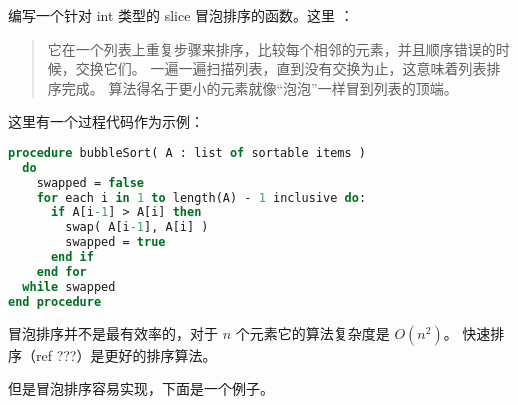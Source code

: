 \begin{Exercise}[title={冒泡排序},difficulty=5]
\label{ex:bubble}
\Question\label{ex:bubble q1} 编写一个针对 int 类型的 slice 冒泡排序的函数。这里 \cite{bubblesort}：
\begin{quote}
它在一个列表上重复步骤来排序，比较每个相邻的元素，并且顺序错误的时候，交换它们。
一遍一遍扫描列表，直到没有交换为止，这意味着列表排序完成。
算法得名于更小的元素就像“泡泡”一样冒到列表的顶端。
\end{quote}

\cite{bubblesort} 这里有一个过程代码作为示例：
\begin{lstlisting}[language=pascal]
procedure bubbleSort( A : list of sortable items )
  do
    swapped = false
    for each i in 1 to length(A) - 1 inclusive do:
      if A[i-1] > A[i] then
        swap( A[i-1], A[i] )
        swapped = true
      end if
    end for
  while swapped
end procedure
\end{lstlisting}
\end{Exercise}

\begin{Answer}
\Question 
冒泡排序并不是最有效率的，对于 $n$ 个元素它的算法复杂度是 $O(n^2)$。
快速排序（ref ???）是更好的排序算法。

但是冒泡排序容易实现，下面是一个例子。


\end{Answer}
